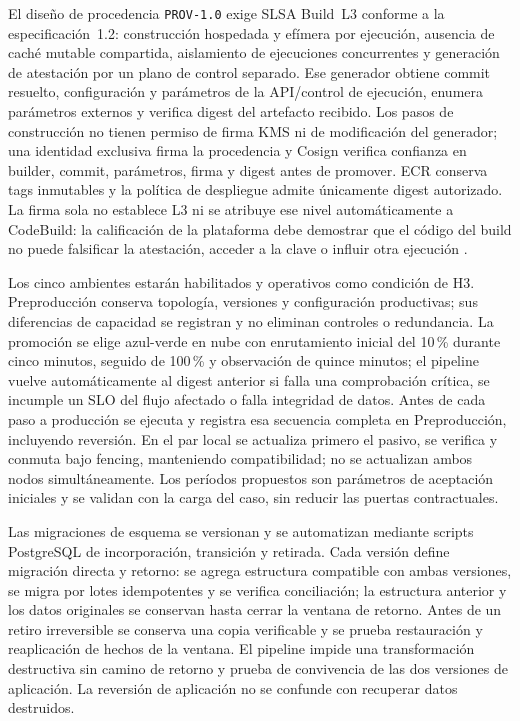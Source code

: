El diseño de procedencia \texttt{PROV-1.0} exige SLSA Build~L3 conforme a la especificación~1.2: construcción hospedada y efímera por ejecución, ausencia de caché mutable compartida, aislamiento de ejecuciones concurrentes y generación de atestación por un plano de control separado. Ese generador obtiene commit resuelto, configuración y parámetros de la API/control de ejecución, enumera parámetros externos y verifica digest del artefacto recibido. Los pasos de construcción no tienen permiso de firma KMS ni de modificación del generador; una identidad exclusiva firma la procedencia y Cosign verifica confianza en builder, commit, parámetros, firma y digest antes de promover. ECR conserva tags inmutables y la política de despliegue admite únicamente digest autorizado. La firma sola no establece L3 ni se atribuye ese nivel automáticamente a CodeBuild: la calificación de la plataforma debe demostrar que el código del build no puede falsificar la atestación, acceder a la clave o influir otra ejecución \parencites{sec-slsa,sec-codebuild}.

Los cinco ambientes estarán habilitados y operativos como condición de H3. Preproducción conserva topología, versiones y configuración productivas; sus diferencias de capacidad se registran y no eliminan controles o redundancia. La promoción se elige azul-verde en nube con enrutamiento inicial del 10\,\% durante cinco minutos, seguido de 100\,\% y observación de quince minutos; el pipeline vuelve automáticamente al digest anterior si falla una comprobación crítica, se incumple un SLO del flujo afectado o falla integridad de datos. Antes de cada paso a producción se ejecuta y registra esa secuencia completa en Preproducción, incluyendo reversión. En el par local se actualiza primero el pasivo, se verifica y conmuta bajo fencing, manteniendo compatibilidad; no se actualizan ambos nodos simultáneamente. Los períodos propuestos son parámetros de aceptación iniciales y se validan con la carga del caso, sin reducir las puertas contractuales.

Las migraciones de esquema se versionan y se automatizan mediante scripts PostgreSQL de incorporación, transición y retirada. Cada versión define migración directa y retorno: se agrega estructura compatible con ambas versiones, se migra por lotes idempotentes y se verifica conciliación; la estructura anterior y los datos originales se conservan hasta cerrar la ventana de retorno. Antes de un retiro irreversible se conserva una copia verificable y se prueba restauración y reaplicación de hechos de la ventana. El pipeline impide una transformación destructiva sin camino de retorno y prueba de convivencia de las dos versiones de aplicación. La reversión de aplicación no se confunde con recuperar datos destruidos.

